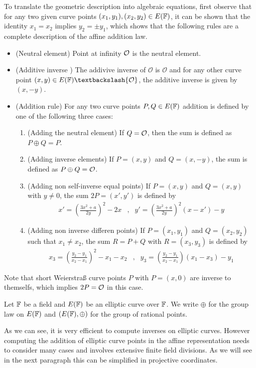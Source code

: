 To translate the geometric description into algebraic equations, first observe that for any two given curve points $(x_1,y_1), (x_2,y_2)\in E(\mathbb{F})$, it can be shown that the identity $x_1=x_2$ implies $y_2=\pm y_1$, which shows that the following rules are a complete description of the affine addition law.
\begin{itemize}
\item (Neutral element) Point at infinity $\mathcal{O}$ is the neutral element.
\item (Additive inverse ) The addivive inverse of $\mathcal{O}$ is $\mathcal{O}$ and for any other curve point $(x,y) \in E(\F)\textbackslash \{\mathcal{O}\}$, the additive inverse is given by $(x,-y)$.
\item (Addition rule) For any two curve points $P, Q \in E(\mathbb{F})$ addition is defined by one of the following three cases:
\begin{enumerate}
\item (Adding the neutral element) If $Q=\mathcal{O}$, then the sum is defined as $P\oplus Q=P$.
\item (Adding inverse elements)  If $P=(x,y)$ and $Q=(x,-y)$, the sum is defined as $P\oplus Q=\mathcal{O}$.
\item (Adding non self-inverse equal points) If $P=(x,y)$ and $Q=(x,y)$ with $y\neq 0$, the sum $2P=(x',y')$ is defined by
$$
\begin{array}{llr}
x' = \left(\frac{3x^2+a}{2y}\right)^2 -2x &,&
y' = \left(\frac{3x^2+a}{2y}\right)^2\left(x-x'\right) - y
\end{array}
$$
\item (Adding non inverse differen points) If $P=(x_1,y_1)$ and $Q=(x_2,y_2)$ such that $x_1 \neq x_2$, the sum $R=P+Q$ with $R=(x_3,y_3)$ is defined by
$$
\begin{array}{llr}
x_3 = \left(\frac{y_2-y_1}{x_2-x_1}\right)^2 -x_1-x_2 &, &
y_3 = \left(\frac{y_2-y_1}{x_2-x_1} \right)\left(x_1-x_3\right) - y_1
\end{array}
$$
\end{enumerate}
\end{itemize}
Note that short Weierstraß curve points $P$ with $P=(x,0)$ are inverse to themselfs, which implies $2P=\mathcal{O}$ in this case.
\begin{notation}
Let $\mathbb{F}$ be a field and $E(\mathbb{F})$ be an elliptic curve over $\mathbb{F}$. We write $\oplus$ for the group law on $E(\mathbb{F})$ and $(E(\mathbb{F}),\oplus)$ for the group of rational points.
\end{notation}
As we can see, it is very efficient to compute inverses on elliptic curves. However computing the addition of elliptic curve points in the affine representation needs to consider many cases and involves extensive finite field divisions. As we will see in the next paragraph this can be simplified in projective coordinates.

